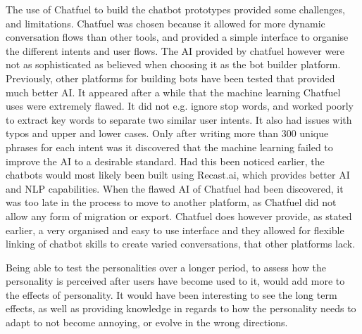 The use of Chatfuel to build the chatbot prototypes provided some challenges, and limitations. Chatfuel was chosen because it allowed for more dynamic conversation flows than other tools, and provided a simple interface to organise the different intents and user flows. The AI provided by chatfuel however were not as sophisticated as believed when choosing it as the bot builder platform. Previously, other platforms for building bots have been tested that provided much better AI. It appeared after a while that the machine learning Chatfuel uses were extremely flawed. It did not e.g. ignore stop words, and worked poorly to extract key words to separate two similar user intents. It also had issues with typos and upper and lower cases. Only after writing more than 300 unique phrases for each intent was it discovered that the machine learning failed to improve the AI to a desirable standard. Had this been noticed earlier, the chatbots would most likely been built using Recast.ai, which provides better AI and NLP capabilities. When the flawed AI of Chatfuel had been discovered, it was too late in the process to move to another platform, as Chatfuel did not allow any form of migration or export. Chatfuel does however provide, as stated earlier, a very organised and easy to use interface and they allowed for flexible linking of chatbot skills to create varied conversations, that other platforms lack. 

Being able to test the personalities over a longer period, to assess how the personality is perceived after users have become used to it, would add more to the effects of personality. It would have been interesting to see the long term effects, as well as providing knowledge in regards to how the personality needs to adapt to not become annoying, or evolve in the wrong directions.